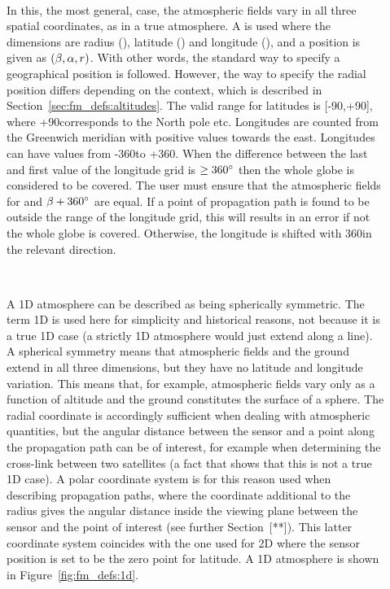 \begin{description}
  
\item[\,\,\,] In this, the most general, case, the
  atmospheric fields vary in all three spatial coordinates, as in a
  true atmosphere. A  is used where the
  dimensions are radius (\Rds), latitude (\Lat) and longitude (\Lon),
  and a position is given as $(\beta,\alpha,r)$. With other words, the
  standard way to specify a geographical position is followed.
  However, the way to specify the radial position differs depending on
  the context, which is described in
  Section~\ref{sec:fm_defs:altitudes}. The valid range for latitudes
  is [-90\degree,+90\degree], where +90\degree corresponds to the
  North pole etc. Longitudes are counted from the Greenwich meridian
  with positive values towards the east. Longitudes can have values
  from -360\degree to +360\degree. When the difference between the
  last and first value of the longitude grid is $\geq 360^\circ$ then
  the whole globe is considered to be covered. The user must ensure
  that the atmospheric fields for \Lon and $\beta+360^\circ$ are
  equal. If a point of propagation path is found to be outside the
  range of the longitude grid, this will results in an error if not
  the whole globe is covered. Otherwise, the longitude is shifted with
  360\degree in the relevant direction.

\item[\,\,\,] A 1D atmosphere can be described as being
  spherically symmetric. The term 1D is used here for simplicity and
  historical reasons, not because it is a true 1D case (a strictly 1D
  atmosphere would just extend along a line). A spherical symmetry
  means that atmospheric fields and the ground extend in all three
  dimensions, but they have no latitude and longitude variation. This
  means that, for example, atmospheric fields vary only as a function
  of altitude and the ground constitutes the surface of a sphere. The
  radial coordinate is accordingly sufficient when dealing with
  atmospheric quantities, but the angular distance between the sensor
  and a point along the propagation path can be of interest, for
  example when determining the cross-link between two satellites (a
  fact that shows that this is not a true 1D case). A polar coordinate
  system is for this reason used when describing propagation paths,
  where the coordinate additional to the radius gives the angular
  distance inside the viewing plane between the sensor and the point
  of interest (see further Section~[**]). This latter coordinate
  system coincides with the one used for 2D where the sensor position
  is set to be the zero point for latitude. A 1D atmosphere is shown
  in Figure~\ref{fig:fm_defs:1d}.
  

\end{description}
